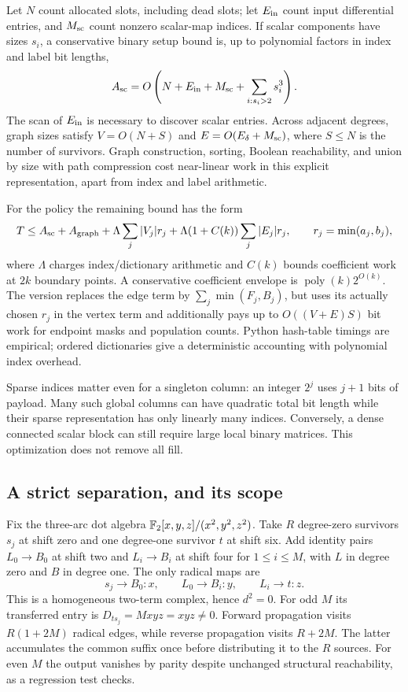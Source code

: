 Let $N$ count allocated slots, including dead slots; let $E_{\rm in}$ count
input differential entries, and $M_{\rm sc}$ count nonzero scalar-map
indices.  If scalar components have sizes $s_i$, a conservative binary
setup bound is, up to polynomial factors in index and label bit lengths,
\[
 A_{\rm sc}=O\left(N+E_{\rm in}+M_{\rm sc}
                  +\sum_{i:s_i>2}s_i^3\right).
\]
The scan of $E_{\rm in}$ is necessary to discover scalar entries.
Across adjacent degrees, graph sizes satisfy
$V=O(N+S)$ and $E=O(E_\delta+M_{\rm sc})$, where $S\le N$ is the number
of survivors.  Graph construction, sorting, Boolean reachability, and
union by size with path compression cost near-linear work in this explicit
representation, apart from index and label arithmetic.

For the  policy the remaining bound has the form
\[
 T\le A_{\rm sc}+A_{\rm graph}
       +\Lambda\sum_j |V_j|r_j
       +\Lambda(1+C(k))\sum_j |E_j|r_j,
 \qquad r_j=\min(a_j,b_j),
\]
where $\Lambda$ charges index/dictionary arithmetic and $C(k)$ bounds
coefficient work at $2k$ boundary points.  A conservative coefficient
envelope is $\operatorname{poly}(k)2^{O(k)}$.  The  version
replaces the edge term by $\sum_j\min(F_j,B_j)$, but uses its actually
chosen $r_j$ in the vertex term and additionally pays up to
$O((V+E)S)$ bit work for endpoint masks and population counts.
Python hash-table timings are empirical; ordered dictionaries give a
deterministic accounting with polynomial index overhead.

Sparse indices matter even for a singleton column: an integer $2^j$ uses
$j+1$ bits of payload.  Many such global columns can have quadratic total
bit length while their sparse representation has only linearly many
indices.  Conversely, a dense connected scalar block can still require
large local binary matrices.  This optimization does not remove all fill.

\subsection{A strict separation, and its scope}

Fix the three-arc dot algebra $\mathbb{F}_2[x,y,z]/(x^2,y^2,z^2)$.
Take $R$ degree-zero survivors $s_j$ at shift zero and one degree-one
survivor $t$ at shift six.  Add identity pairs $L_0\to B_0$ at shift two
and $L_i\to B_i$ at shift four for $1\le i\le M$, with $L$ in degree
zero and $B$ in degree one.  The only radical maps are
\[
 s_j\to B_0:x,\qquad L_0\to B_i:y,\qquad L_i\to t:z.
\]
This is a homogeneous two-term complex, hence $d^2=0$.  For odd $M$ its
transferred entry is $D_{ts_j}=Mxyz=xyz\ne0$.  Forward propagation visits
$R(1+2M)$ radical edges, while reverse propagation visits $R+2M$.
The latter accumulates the common suffix once before distributing it to
the $R$ sources.  For even $M$ the output vanishes by parity despite
unchanged structural reachability, as a regression test checks.

